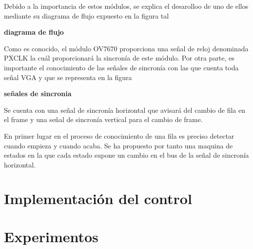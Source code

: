 	Debido a la importancia de estos módulos, se explica el desarolloo de uno de ellos mediante su diagrama de flujo expuesto en la figura tal
	
	\textbf{diagrama de flujo}
	
	Como es conocido, el módulo OV7670 proporciona una señal de reloj denominada PXCLK la cuál proporcionará la sincronía de este módulo. Por otra parte, es importante el conocimiento de las señales de sincronía con las que cuenta toda señal VGA y que se representa en la figura
	
	\textbf{señales de sincronia}
	
	Se cuenta con una señal de sincronía horizontal que avisará del cambio de fila en el frame y una señal de sincronía vertical para el cambio de frame.
	
	En primer lugar en el proceso de conocimiento de una fila es preciso detectar cuando empieza y cuando acaba. Se ha propuesto por tanto una maquina de estados en la que cada estado supone un cambio en el bus de la señal de sincronía horizontal. 

\section{Implementación del control}



\section{Experimentos}









